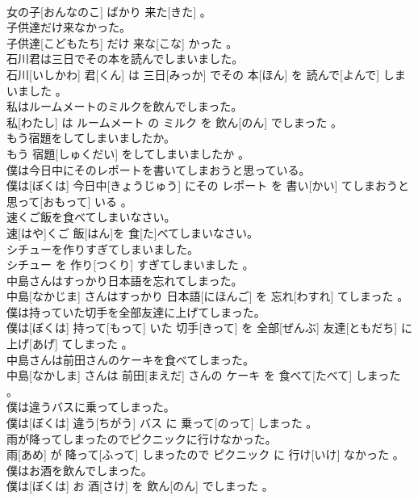 \documentclass[8pt]{extreport}
\begin{document}
\begin{CJK}{UTF8}{min}
\\	女の子[おんなのこ] ばかり 来た[きた] 。
\\	子供達だけ来なかった。	
\\	子供達[こどもたち] だけ 来な[こな] かった 。
\\	石川君は三日でその本を読んでしまいました。	
\\	石川[いしかわ] 君[くん] は 三日[みっか] でその 本[ほん] を 読んで[よんで] しまいました 。
\\	私はルームメートのミルクを飲んでしまった。	
\\	私[わたし] は ルームメート の ミルク を 飲ん[のん] でしまった 。
\\	もう宿題をしてしまいましたか。	
\\	もう 宿題[しゅくだい] をしてしまいましたか 。
\\	僕は今日中にそのレポートを書いてしまおうと思っている。	
\\	僕は[ぼくは] 今日中[きょうじゅう] にその レポート を 書い[かい] てしまおうと 思って[おもって] いる 。
\\	速くご飯を食べてしまいなさい。	
\\	速[はや]くご 飯[はん]を 食[た]べてしまいなさい。
\\	シチューを作りすぎてしまいました。	
\\	シチュー を 作り[つくり] すぎてしまいました 。
\\	中島さんはすっかり日本語を忘れてしまった。	
\\	中島[なかじま] さんはすっかり 日本語[にほんご] を 忘れ[わすれ] てしまった 。
\\	僕は持っていた切手を全部友達に上げてしまった。	
\\	僕は[ぼくは] 持って[もって] いた 切手[きって] を 全部[ぜんぶ] 友達[ともだち] に 上げ[あげ] てしまった 。
\\	中島さんは前田さんのケーキを食べてしまった。	
\\	中島[なかしま] さんは 前田[まえだ] さんの ケーキ を 食べて[たべて] しまった 。
\\	僕は違うバスに乗ってしまった。	
\\	僕は[ぼくは] 違う[ちがう] バス に 乗って[のって] しまった 。
\\	雨が降ってしまったのでピクニックに行けなかった。	
\\	雨[あめ] が 降って[ふって] しまったので ピクニック に 行け[いけ] なかった 。
\\	僕はお酒を飲んでしまった。	
\\	僕は[ぼくは] お 酒[さけ] を 飲ん[のん] でしまった 。

\end{CJK}
\end{document}
